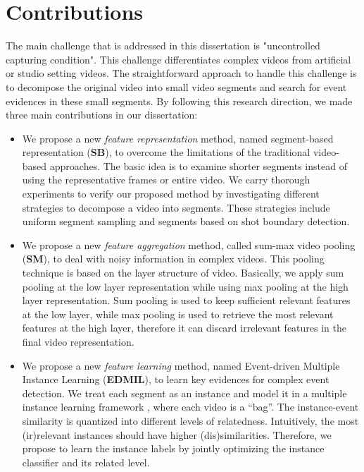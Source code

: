 \section{Contributions}

The main challenge that is addressed in this dissertation is "uncontrolled capturing condition". This challenge differentiates complex videos from artificial or studio setting videos. The straightforward approach to handle this challenge is to decompose the original video into small video segments and search for event evidences in these small segments. By following this research direction, we made three main contributions in our dissertation:

\begin{itemize}
\item We propose a new \textit{feature representation} method, named segment-based representation (\textbf{SB}), to overcome the limitations of the traditional video-based approaches. The basic idea is to examine shorter segments instead of using the representative frames or entire video. We carry thorough experiments to verify our proposed method by investigating different strategies to decompose a video into segments. These strategies include uniform segment sampling and segments based on shot boundary detection.

\item We propose a new \textit{feature aggregation} method, called sum-max video pooling (\textbf{SM}), to deal with noisy information in complex videos. This pooling technique is based on the layer structure of video. Basically, we apply sum pooling at the low layer representation while using max pooling at the high layer representation. Sum pooling is used to keep sufficient relevant features at the low layer, while max pooling is used to retrieve the most relevant features at the high layer, therefore it can discard irrelevant features in the final video representation. 
	
\item We propose a new \textit{feature learning} method, named Event-driven Multiple Instance Learning (\textbf{EDMIL}), to learn key evidences for complex event detection. We treat each segment as an instance and model it in a multiple instance learning framework \cite{andrews2002support}, where each video is a ``bag''. The instance-event similarity is quantized into different levels of relatedness. Intuitively, the most (ir)relevant instances should have higher (dis)similarities. Therefore, we propose to learn the instance labels by jointly optimizing the instance classifier and its related level.
	
\end{itemize}

